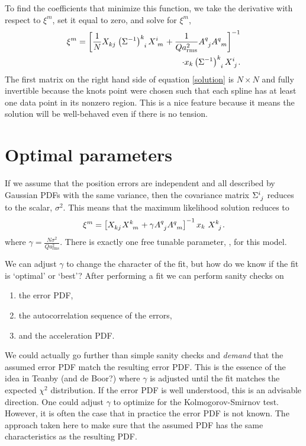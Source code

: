 \documentclass[twocol]{ametsoc}
\begin{document}
To find the coefficients that minimize this function, we take the derivative with respect to $\xi^m$, set it equal to zero, and solve for $\xi^m$,
\begin{equation}
\begin{split}
\xi^m = \left[\frac{1}{N} X\indices{_k_j} \left(\Sigma^{-1}\right)\indices{^k_i}  X\indices{^i_m} + \frac{1}{Q a_{\textrm{rms}}^2} {A}\indices{^q_j}{A}\indices{^q_m} \right]^{-1} \\
\cdot x_k \left(\Sigma^{-1}\right)\indices{^k_i}   X\indices{^i_j}.
\end{split}
\label{solution}
\end{equation}
The first matrix on the right hand side of equation \ref{solution} is $N\times N$ and fully invertible because the knots point were chosen such that each spline has at least one data point in its nonzero region. This is a nice feature because it means the solution will be well-behaved even if there is no tension.


\section{Optimal parameters}

If we assume that the position errors are independent and all described by Gaussian PDFs with the same variance, then the covariance matrix $\Sigma\indices{^i_j}$ reduces to the scalar, $\sigma^2$. This means that the maximum likelihood solution reduces to
\begin{equation}
\xi^m = \left[ X\indices{_k_j}   X\indices{^k_m} + \gamma {A}\indices{^q_j}{A}\indices{^q_m} \right]^{-1} 
 x_k \   X\indices{^k_j}.
\label{scalar-solution}
\end{equation}
where $\gamma = \frac{N \sigma^2}{Q a_{\textrm{rms}}^2}$. There is exactly one free tunable parameter, , for this model.

We can adjust $\gamma$ to change the character of the fit, but how do we know if the fit is `optimal' or `best'? After performing a fit we can perform sanity checks on
\begin{enumerate}
\item the error PDF,
\item the autocorrelation sequence of the errors,
\item and the acceleration PDF.
\end{enumerate}
We could actually go further than simple sanity checks and \emph{demand} that the assumed error PDF match the resulting error PDF. This is the essence of the idea in Teanby (and de Boor?) where $\gamma$ is adjusted until the fit matches the expected $\chi^2$ distribution. If the error PDF is well understood, this is an advisable direction. One could adjust $\gamma$ to optimize for the Kolmogorov-Smirnov test. However, it is often the case that in practice the error PDF is not known. The approach taken here to make sure that the assumed PDF has the same characteristics as the resulting PDF.
\end{document}
